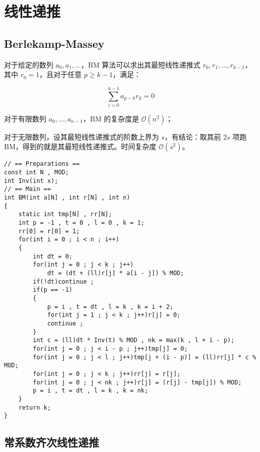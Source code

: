\section{线性递推}

\subsection{Berlekamp-Massey}

对于给定的数列 $a_0,a_1,\dots$，BM 算法可以求出其最短线性递推式 $r_{0},r_{1},\dots,r_{k-1}$，其中 $r_0=1$，且对于任意 $p\ge k-1$，满足：

$$
\sum\limits_{i=0}^{k-1} a_{p-k}r_{k} = 0
$$

对于有限数列 $a_0,\dots,a_{n-1}$，BM 的复杂度是 $\mathcal{O}(n^2)$；

对于无限数列，设其最短线性递推式的阶数上界为 $s$，有结论：取其前 $2s$ 项跑 BM，得到的就是其最短线性递推式。时间复杂度 $\mathcal{O}(s^2)$。

\begin{verbatim}
// == Preparations ==
const int N , MOD;
int Inv(int x);
// == Main ==
int BM(int a[N] , int r[N] , int n)
{
	static int tmp[N] , rr[N];
	int p = -1 , t = 0 , l = 0 , k = 1; 
	rr[0] = r[0] = 1;
	for(int i = 0 ; i < n ; i++)
	{
		int dt = 0;
		for(int j = 0 ; j < k ; j++)
			dt = (dt + (ll)r[j] * a[i - j]) % MOD;
		if(!dt)continue ;
		if(p == -1)
		{
			p = i , t = dt , l = k , k = i + 2;
			for(int j = 1 ; j < k ; j++)r[j] = 0;
			continue ;
		}
		int c = (ll)dt * Inv(t) % MOD , nk = max(k , l + i - p);
		for(int j = 0 ; j < i - p ; j++)tmp[j] = 0;
		for(int j = 0 ; j < l ; j++)tmp[j + (i - p)] = (ll)rr[j] * c % MOD;
		for(int j = 0 ; j < k ; j++)rr[j] = r[j];
		for(int j = 0 ; j < nk ; j++)r[j] = (r[j] - tmp[j]) % MOD;
		p = i , t = dt , l = k , k = nk;
	}
	return k;
}
\end{verbatim}

\subsection{常系数齐次线性递推}

